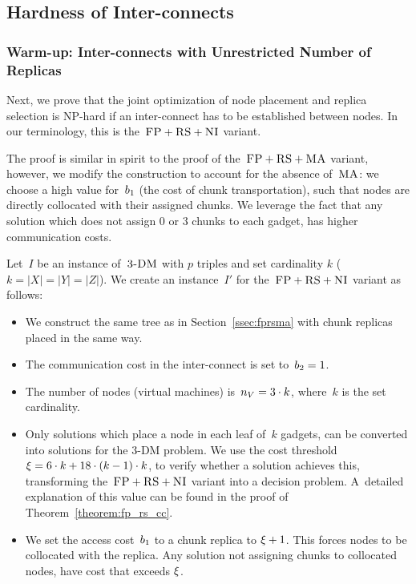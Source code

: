 \subsection{Hardness of Inter-connects}\label{ssec:fprscc}


\subsubsection{Warm-up: Inter-connects with Unrestricted Number of Replicas}

Next, we prove that the joint optimization of node placement and replica selection
is NP-hard if an inter-connect has to be established between nodes.
In our terminology, this is the~$\textsc{FP}+\textsc{RS}+\textsc{NI}$ variant.

The proof is similar in spirit to the proof of the~$\textsc{FP}+\textsc{RS}+\textsc{MA}$ variant, however,
we modify the construction to account for the absence of~$\textsc{MA}$:
we choose
a high value for~$b_1$ (the cost of chunk transportation), such that nodes are directly collocated with
their assigned chunks. We leverage the fact that any solution which does not
assign 0 or 3 chunks to each gadget, has higher communication costs.

Let~$I$ be an instance of~$\textsc{3-DM}$ with $p$ triples and set cardinality $k$ ($k = |X| = |Y| = |Z|$). We create an instance~$I'$
for the~$\textsc{FP}+\textsc{RS}+\textsc{NI}$ variant as follows:
\begin{itemize}
\item We construct the same tree as in Section~\ref{ssec:fprsma} with
chunk replicas placed in the same way.
\item The communication cost in the inter-connect is set to~$b_2 = 1$.
\item The number of nodes (virtual machines) is~$n_V = 3 \cdot k$, where~$k$ is the set cardinality.
\item Only solutions which place a node in each leaf of~$k$ gadgets, can
be converted into solutions for the 3-DM problem. We use the cost threshold
$\xi =  6 \cdot k + 18 \cdot
(k - 1) \cdot k$, to verify whether a solution achieves this, transforming
the~$\textsc{FP}+\textsc{RS}+\textsc{NI}$ variant into a decision problem. A~detailed explanation of this value can
be found in the proof of Theorem~\ref{theorem:fp_rs_cc}.
\item We set the access cost~$b_1$ to a chunk replica to $\xi + 1$. This forces
nodes to be collocated with the replica. Any solution not
assigning chunks to collocated nodes, have cost that exceeds $\xi$.
\end{itemize}

